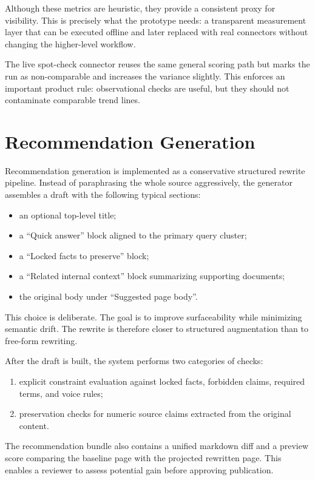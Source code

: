 Although these metrics are heuristic, they provide a consistent proxy for visibility. This is
precisely what the prototype needs: a transparent measurement layer that can be executed
offline and later replaced with real connectors without changing the higher-level workflow.

The live spot-check connector reuses the same general scoring path but marks the run as
non-comparable and increases the variance slightly. This enforces an important product rule:
observational checks are useful, but they should not contaminate comparable trend lines.

\section{Recommendation Generation}

Recommendation generation is implemented as a conservative structured rewrite pipeline.
Instead of paraphrasing the whole source aggressively, the generator assembles a draft with the
following typical sections:
\begin{itemize}
    \item an optional top-level title;
    \item a ``Quick answer'' block aligned to the primary query cluster;
    \item a ``Locked facts to preserve'' block;
    \item a ``Related internal context'' block summarizing supporting documents;
    \item the original body under ``Suggested page body''.
\end{itemize}

This choice is deliberate. The goal is to improve surfaceability while minimizing semantic drift.
The rewrite is therefore closer to structured augmentation than to free-form rewriting.

After the draft is built, the system performs two categories of checks:
\begin{enumerate}
    \item explicit constraint evaluation against locked facts, forbidden claims, required terms, and voice rules;
    \item preservation checks for numeric source claims extracted from the original content.
\end{enumerate}

The recommendation bundle also contains a unified markdown diff and a preview score
comparing the baseline page with the projected rewritten page. This enables a reviewer to
assess potential gain before approving publication.

